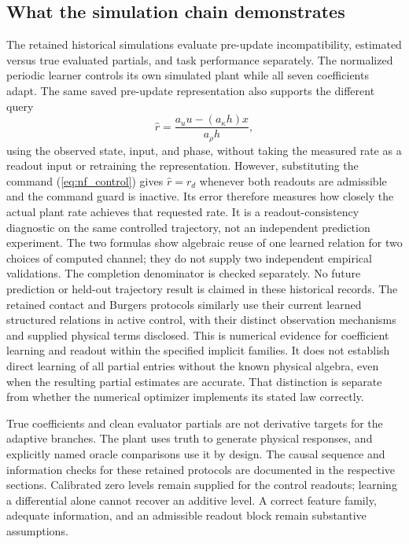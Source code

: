 \documentclass[journal]{IEEEtran}
\begin{document}
\subsection{What the simulation chain demonstrates}
The retained historical simulations evaluate pre-update incompatibility, estimated versus
true evaluated partials, and task performance separately. The normalized
periodic learner controls its own simulated plant while all seven
coefficients adapt. The same saved pre-update representation also supports
the different query
\begin{equation}
 \widehat r=\frac{a_u u-(a_\kappa h)x}{a_\rho h},
 \label{eq:inventory_rate_readout}
\end{equation}
using the observed state, input, and phase, without taking the measured
rate as a readout input or retraining the representation. However,
substituting the command (\ref{eq:nf_control}) gives
$\widehat r=r_d$ whenever both readouts are admissible and the command
guard is inactive. Its error therefore measures how closely the actual
plant rate achieves that requested rate. It is a readout-consistency
diagnostic on the same controlled trajectory, not an independent
prediction experiment. The two formulas show algebraic reuse of one
learned relation for two choices of computed channel; they do not supply
two independent empirical validations. The completion denominator is
checked separately. No future prediction or held-out trajectory result
is claimed in these historical records. The retained contact and Burgers
protocols similarly use their current learned
structured relations in active control, with their distinct observation
mechanisms and supplied physical terms disclosed. This is numerical evidence
for coefficient learning and readout within the specified implicit families.
It does not establish direct learning of all partial entries without the
known physical algebra, even when the resulting partial estimates are
accurate. That distinction is separate from whether the numerical optimizer
implements its stated law correctly.

True coefficients and clean evaluator partials are not derivative targets
for the adaptive branches. The plant uses truth to generate physical
responses, and explicitly named oracle comparisons use it by design.
The causal sequence and information checks for these retained protocols are
documented in the respective sections. Calibrated zero levels remain
supplied for the control readouts; learning a differential alone cannot
recover an additive level. A correct feature family, adequate information,
and an admissible readout block remain substantive assumptions.
\end{document}
